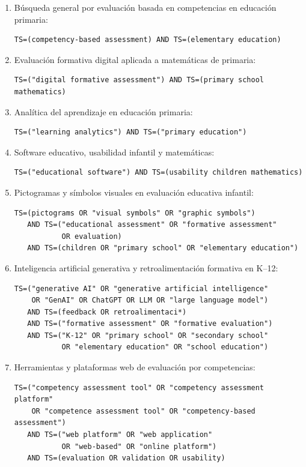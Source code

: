 \begin{enumerate}
\item Búsqueda general por evaluación basada en competencias en educación primaria:
\begin{Verbatim}[fontsize=\footnotesize, xleftmargin=1.5em]
TS=(competency-based assessment) AND TS=(elementary education)
\end{Verbatim}

\item Evaluación formativa digital aplicada a matemáticas de primaria:
\begin{Verbatim}[fontsize=\footnotesize, xleftmargin=1.5em]
TS=("digital formative assessment") AND TS=(primary school mathematics)
\end{Verbatim}

\item Analítica del aprendizaje en educación primaria:
\begin{Verbatim}[fontsize=\footnotesize, xleftmargin=1.5em]
TS=("learning analytics") AND TS=("primary education")
\end{Verbatim}

\item Software educativo, usabilidad infantil y matemáticas:
\begin{Verbatim}[fontsize=\footnotesize, xleftmargin=1.5em]
TS=("educational software") AND TS=(usability children mathematics)
\end{Verbatim}

\item Pictogramas y símbolos visuales en evaluación educativa infantil:
\begin{Verbatim}[fontsize=\footnotesize, xleftmargin=1.5em]
TS=(pictograms OR "visual symbols" OR "graphic symbols")
   AND TS=("educational assessment" OR "formative assessment"
           OR evaluation)
   AND TS=(children OR "primary school" OR "elementary education")
\end{Verbatim}

\item Inteligencia artificial generativa y retroalimentación formativa en K--12:
\begin{Verbatim}[fontsize=\footnotesize, xleftmargin=1.5em]
TS=("generative AI" OR "generative artificial intelligence"
    OR "GenAI" OR ChatGPT OR LLM OR "large language model")
   AND TS=(feedback OR retroalimentaci*)
   AND TS=("formative assessment" OR "formative evaluation")
   AND TS=("K-12" OR "primary school" OR "secondary school"
           OR "elementary education" OR "school education")
\end{Verbatim}

\item Herramientas y plataformas web de evaluación por competencias:
\begin{Verbatim}[fontsize=\footnotesize, xleftmargin=1.5em]
TS=("competency assessment tool" OR "competency assessment platform"
    OR "competence assessment tool" OR "competency-based assessment")
   AND TS=("web platform" OR "web application"
           OR "web-based" OR "online platform")
   AND TS=(evaluation OR validation OR usability)
\end{Verbatim}
\end{enumerate}

